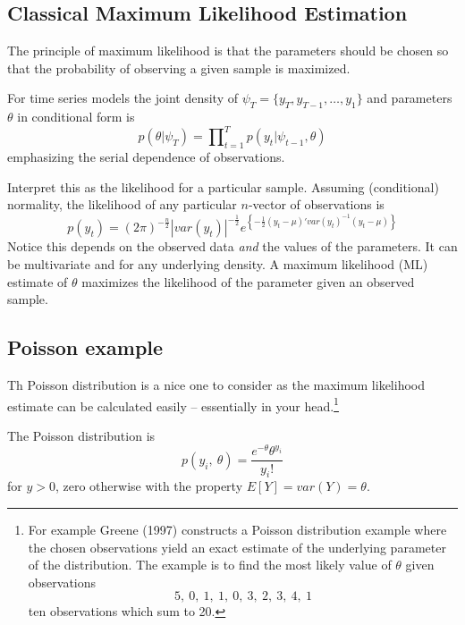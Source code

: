 \documentclass[
  letterpaper,
]{book}
\begin{document}
\hypertarget{classical-maximum-likelihood-estimation}{%
\subsection{Classical Maximum Likelihood
Estimation}\label{classical-maximum-likelihood-estimation}}

The principle of maximum likelihood is that the parameters should be
chosen so that the probability of observing a given sample is maximized.

For time series models the joint density of
\(\psi_T = \{y_T, y_{T-1},\ldots ,y_1 \}\) and parameters \(\theta\) in
conditional form is \begin{equation}
 p(\theta|\psi_T) = \prod\nolimits_{t=1}^T p (y_t|\psi_{t-1},\theta)
\end{equation} emphasizing the serial dependence of observations.

Interpret this as the likelihood for a particular sample. Assuming
(conditional) normality, the likelihood of any particular \(n\)-vector
of observations is \begin{equation}
p(y_t) = (2\pi)^{-\frac{n}{2}}|var(y_t)|^{-\frac{1}{2}}e^{\left\{ -\frac{1}{2}(y_t-\mu )' var(y_t)^{-1}(y_t-\mu)\right\} }
\end{equation} Notice this depends on the observed data \emph{and} the
values of the parameters. It can be multivariate and for any underlying
density. A maximum likelihood (ML) estimate of \(\theta\) maximizes the
likelihood of the parameter given an observed sample.

\hypertarget{poisson-example}{%
\subsection{Poisson example}\label{poisson-example}}

Th Poisson distribution is a nice one to consider as the maximum
likelihood estimate can be calculated easily -- essentially in your
head.\footnote{For example Greene (1997) constructs a Poisson
  distribution example where the chosen observations yield an exact
  estimate of the underlying parameter of the distribution. The example
  is to find the most likely value of \(\theta\) given observations
  \begin{equation}
  5,\ 0,\ 1,\ 1,\ 0,\ 3,\ 2,\ 3,\ 4,\ 1
  \end{equation} ten observations which sum to 20.}

The Poisson distribution is \begin{equation}
 p(y_i,\ \theta )=\frac{e^{-\theta }\theta ^{y_i}}{y_i!}
\end{equation} for \(y>0\), zero otherwise with the property
\(E[Y]=var(Y)=\theta\).
\end{document}
